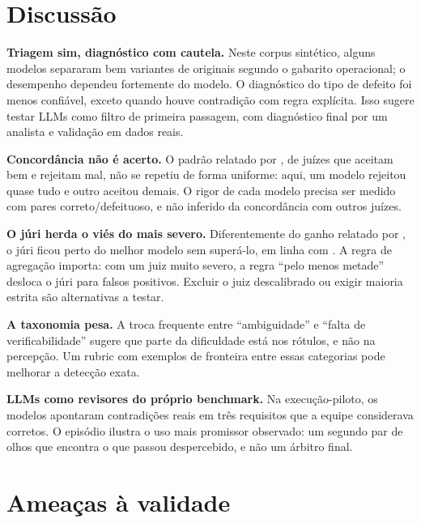 \documentclass[12pt]{article}
\begin{document}
\section{Discussão}

\textbf{Triagem sim, diagnóstico com cautela.} Neste corpus sintético, alguns modelos separaram bem variantes de originais segundo o gabarito operacional; o desempenho dependeu fortemente do modelo. O diagnóstico do tipo de defeito foi menos confiável, exceto quando houve contradição com regra explícita. Isso sugere testar LLMs como filtro de primeira passagem, com diagnóstico final por um analista e validação em dados reais.

\textbf{Concordância não é acerto.} O padrão relatado por \citet{jain2025}, de juízes que aceitam bem e rejeitam mal, não se repetiu de forma uniforme: aqui, um modelo rejeitou quase tudo e outro aceitou demais. O rigor de cada modelo precisa ser medido com pares correto/defeituoso, e não inferido da concordância com outros juízes.

\textbf{O júri herda o viés do mais severo.} Diferentemente do ganho relatado por \citet{verga2024}, o júri ficou perto do melhor modelo sem superá-lo, em linha com \citet{williams2025}. A regra de agregação importa: com um juiz muito severo, a regra ``pelo menos metade'' desloca o júri para falsos positivos. Excluir o juiz descalibrado ou exigir maioria estrita são alternativas a testar.

\textbf{A taxonomia pesa.} A troca frequente entre ``ambiguidade'' e ``falta de verificabilidade'' sugere que parte da dificuldade está nos rótulos, e não na percepção. Um rubric com exemplos de fronteira entre essas categorias pode melhorar a detecção exata.

\textbf{LLMs como revisores do próprio benchmark.} Na execução-piloto, os modelos apontaram contradições reais em três requisitos que a equipe considerava corretos. O episódio ilustra o uso mais promissor observado: um segundo par de olhos que encontra o que passou despercebido, e não um árbitro final.

\section{Ameaças à validade}
\end{document}
